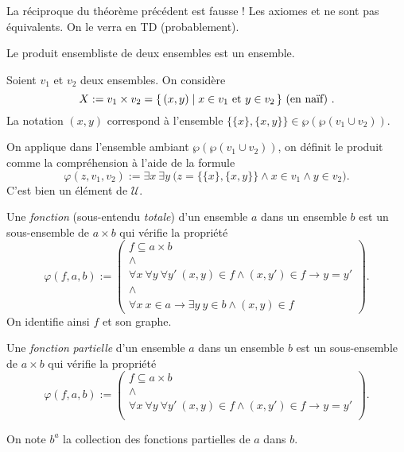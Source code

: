 \documentclass[./main]{subfiles}
\begin{document}
  \begin{rmk}
    La réciproque du théorème précédent est fausse ! Les axiomes  et  ne sont pas équivalents. On le verra en TD (probablement).
  \end{rmk}

  \begin{prop}
    Le produit ensembliste de deux ensembles est un ensemble.
  \end{prop}

  \begin{prv}
    Soient $v_1$ et $v_2$ deux ensembles.
    On considère \[
    X := v_1 \times v_2 = \mleft\{\,(x,y) \;\middle|\; x \in v_1 \text{ et } y \in v_2 \,\mright\} \text{ (en naïf) }
    .\] 
    La notation $(x,y)$ correspond à l'ensemble $\{\{x\} , \{x,y\}\} \in \wp(\wp(v_1 \cup v_2))$.

    On applique  dans l'ensemble ambiant  $\wp(\wp(v_1 \cup v_2))$, on définit le produit comme la compréhension à l'aide de la formule 
    \[
    \varphi(z, v_1, v_2) := \exists x \: \exists y \: \big(z = \{\{x\} , \{x,y\} \}  \land x \in v_1 \land y \in v_2\big)
    .\]
    C'est bien un élément de $\mathcal{U}$.
  \end{prv}

  \begin{defn}
    Une \textit{fonction} (sous-entendu \textit{totale}) d'un ensemble $a$ dans un ensemble $b$ est un sous-ensemble de $a \times b$ qui vérifie la propriété
    \[
    \varphi(f, a, b) := 
    \begin{pmatrix} 
      f \subseteq a \times b\\
      \land\\
      \forall x \: \forall  y \: \forall y' \: (x, y )\in f \land (x, y') \in f  \to y = y'\\
      \land\\
      \forall x \: x \in a \to \exists y \: y \in b \land (x,y) \in f
    \end{pmatrix}
    .\]
    On identifie ainsi $f$ et son graphe.


    Une \textit{fonction} \textit{partielle} d'un ensemble $a$ dans un ensemble $b$ est un sous-ensemble de $a \times b$ qui vérifie la propriété
    \[
    \varphi(f, a, b) := 
    \begin{pmatrix} 
      f \subseteq a \times b\\
      \land\\
      \forall x \: \forall  y \: \forall y' \: (x, y )\in f \land (x, y') \in f  \to y = y'\\
    \end{pmatrix}
    .\]

    On note $b^a$ la collection des fonctions partielles de $a$ dans $b$.
  \end{defn}
\end{document}
